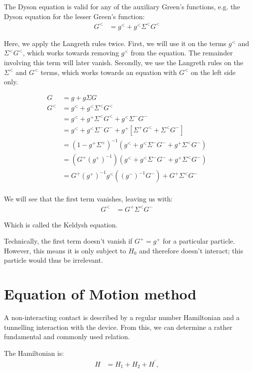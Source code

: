 The Dyson equation is valid for any of the auxiliary Green's functions, e.g. the Dyson equation for the lesser Green's function:
\begin{align*}
G^< &= g^< + g^< \Sigma^< G^<  
\end{align*}

Here, we apply the Langreth rules twice. First, we will use it on the terms $g^<$ and $\Sigma^< G^<$, which works towards removing $g^<$ from the equation. The remainder involving this term will later vanish. Secondly, we use the Langreth rules on the $\Sigma^<$ and $G^<$ terms, which works towards an equation with $G^<$ on the left side only.


\begin{align*}
G &= g + g\Sigma G \\
G^< &= g^<  + g^< \Sigma^< G^< \\
 &= g^<  + g^+ \Sigma^< G^< + g^< \Sigma^- G^- \\
 &= g^<  + g^< \Sigma^- G^- + g^+ \left[ \Sigma^+ G^< + \Sigma^< G^- \right]\\
 &= (1 - g^+ \Sigma^+)^{-1} \left( g^<  + g^< \Sigma^- G^- + g^+ \Sigma^< G^-\right) \\
 &= \left(G^+ (g^+)^{-1}\right)\left( g^<  + g^< \Sigma^- G^- + g^+ \Sigma^< G^-\right) \\ 
&= G^+ (g^+)^{-1} g^< \left((g^-)^{-1}G^-  \right) + G^+  \Sigma^< G^- \\
\end{align*}

We will see that the first term vanishes, leaving us with:
\begin{align*}
G^< &=  G^+ \Sigma^< G^- 
\end{align*}

Which is called the Keldysh equation.

Technically, the first term doesn't vanish if $G^+ = g^+$ for a particular particle. However, this means it is only subject to $H_0$ and therefore doesn't interact; this particle would thus be irrelevant.

\section{Equation of Motion method}
\label{sec:eommethod}
A non-interacting contact is described by a regular number Hamiltonian and a tunnelling interaction with the device. From this, we can determine a rather fundamental and commonly used relation. 

The Hamiltonian is:
\begin{align}
H &= H_1 + H_2 + H^\prime, \label{eq:hamiltonian}
\end{align}


